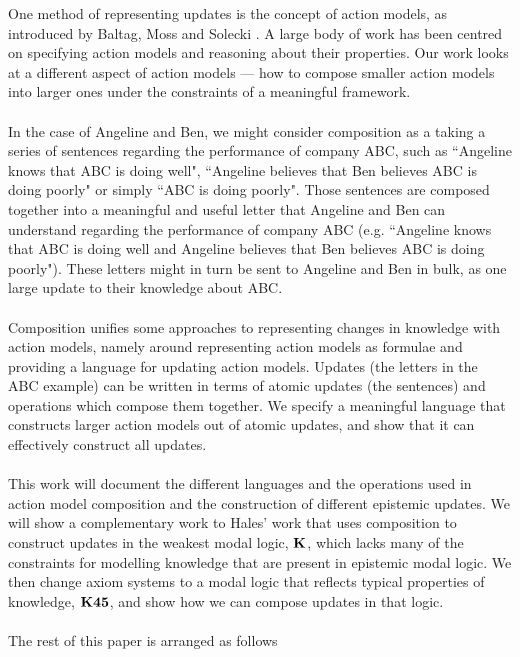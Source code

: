 One method of representing updates is the concept of action models, as
introduced by Baltag, Moss and Solecki \cite{baltag1998lpa}.
A large body of work has been centred on specifying action models and reasoning
about their properties.
Our work looks at a different aspect of action models --- how to compose smaller action models
into larger ones under the constraints of a meaningful framework.\\
\\
In the case of Angeline and Ben, we might consider composition as a taking a series of sentences
regarding the performance of company ABC, such as ``Angeline knows that ABC is doing well", ``Angeline
believes that Ben believes ABC is doing poorly" or simply ``ABC is doing poorly".
Those sentences are composed together into a meaningful and useful letter that Angeline and Ben can
understand regarding the performance of company ABC (e.g. ``Angeline knows that ABC is doing well
and Angeline believes that Ben believes ABC is doing poorly").
These letters might in turn be sent to Angeline and Ben in bulk, as one large update to their knowledge
about ABC.\\
\\
Composition unifies some approaches to representing changes in knowledge with action models, namely
around representing action models as formulae and providing a language for updating action models.
Updates (the letters in the ABC example) can be written in terms of atomic updates (the sentences)
and operations which compose them together.
We specify a meaningful language that constructs larger action models out of atomic updates, and
show that it can effectively construct all updates.\\
\\
This work will document the different languages and the operations used in action model composition
and the construction of different epistemic updates.
We will show a complementary work to Hales' \cite{hales13synthesis} work that uses composition to
construct updates in the weakest modal logic,
$\bf K$, which lacks many of the constraints for modelling knowledge that are present in epistemic modal logic.
We then change axiom systems to a modal logic that reflects typical properties of knowledge,
$\bf K45$, and show how we can compose updates in that logic.\\
\\
The rest of this paper is arranged as follows
